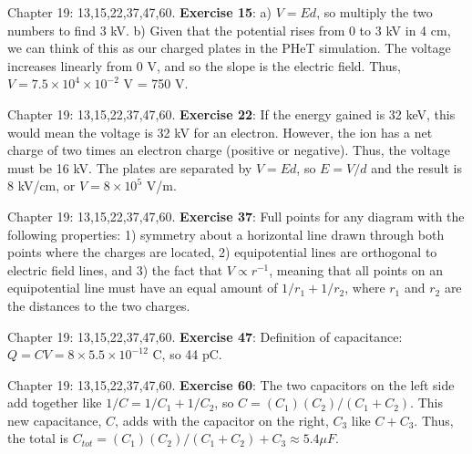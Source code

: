 \documentclass{beamer}
\begin{document}
\begin{frame}{Chapter 19: 13,15,22,37,47,60.}
\small
\textbf{Exercise 15}: a) $V = Ed$, so multiply the two numbers to find 3 kV.  b) Given that the potential rises from 0 to 3 kV in 4 cm, we can think of this as our charged plates in the PHeT simulation.  The voltage increases linearly from 0 V, and so the slope is the electric field.  Thus, $V = 7.5 \times 10^4 \times 10^{-2}$ V = 750 V.
\end{frame}

\begin{frame}{Chapter 19: 13,15,22,37,47,60.}
\small
\textbf{Exercise 22}: If the energy gained is 32 keV, this would mean the voltage is 32 kV for an electron.  However, the ion has a net charge of two times an electron charge (positive or negative).  Thus, the voltage must be 16 kV.  The plates are separated by $V = Ed$, so $E = V/d$ and the result is 8 kV/cm, or $V = 8 \times 10^5$ V/m.
\end{frame}

\begin{frame}{Chapter 19: 13,15,22,37,47,60.}
\small
\textbf{Exercise 37}: Full points for any diagram with the following properties: 1) symmetry about a horizontal line drawn through both points where the charges are located, 2) equipotential lines are orthogonal to electric field lines, and 3) the fact that $V \propto r^{-1}$, meaning that all points on an equipotential line must have an equal amount of $1/r_1 + 1/r_2$, where $r_1$ and $r_2$ are the distances to the two charges.
\end{frame}

\begin{frame}{Chapter 19: 13,15,22,37,47,60.}
\small
\textbf{Exercise 47}: Definition of capacitance: $Q = CV = 8 \times 5.5 \times 10^{-12}$ C, so 44 pC.
\end{frame}

\begin{frame}{Chapter 19: 13,15,22,37,47,60.}
\small
\textbf{Exercise 60}: The two capacitors on the left side add together like $1/C = 1/C_1 + 1/C_2$, so $C = (C_1)(C_2)/(C_1+C_2)$.  This new capacitance, $C$, adds with the capacitor on the right, $C_3$ like $C+C_3$.  Thus, the total is $C_{tot} = (C_1)(C_2)/(C_1+C_2) + C_3 \approx 5.4 \mu F$.
\end{frame}
\end{document}
